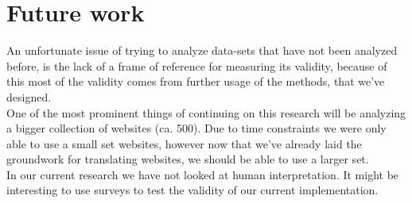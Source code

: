 \section{Future work}
An unfortunate issue of trying to analyze data-sets that have not been analyzed before, is the lack of a frame of reference for measuring its validity, because of this most of the validity comes from further usage of the methods, that we've designed.
\\ One of the most prominent things of continuing on this research will be analyzing a bigger collection of websites (ca. 500). Due to time constraints we were only able to use a small set websites, however now that we've already laid the groundwork for translating websites, we should be able to use a larger set.
\\ In our current research we have not looked at human interpretation. It might be interesting to use surveys to test the validity of our current implementation.